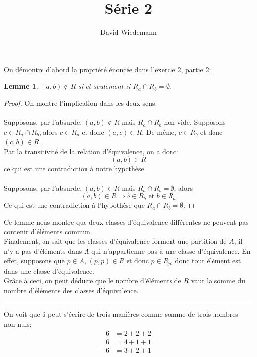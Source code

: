 \documentclass[11pt, a4paper]{article}
\newtheorem{lemma}{Lemme}
\newcommand\hr{
    \noindent\rule[0.5ex]{\linewidth}{0.5pt}\newline
}
\begin{document}
\title{Série 2}
\author{David Wiedemann}
\maketitle
On démontre d'abord la propriété énoncée dans l'exercie 2, partie 2:
\begin{lemma}
	$(a,b) \notin R$ si et seulement si $R_a \cap R_b = \emptyset$.
\end{lemma}
\begin{proof}
On montre l'implication dans les deux sens.\\
\framebox[1.1\width]{$  \Longrightarrow $}\\
Supposons, par l'absurde, $(a,b) \notin R$ mais $R_a \cap R_b$ non vide.
Supposons $ c \in R_a \cap R_b$, alors $c \in R_a$ et donc $(a,c) \in R$.
De même, $c \in R_b$ et donc $(c,b) \in R$.\\
Par la transitivité de la relation d'équivalence, on a donc:
\[ 
	(a,b) \in R
\]
ce qui est une contradiction à notre hypothèse.\\
\framebox[1.1\width]{$  \Longleftarrow $}\\
Supposons, par l'absurde, $(a,b) \in R$ mais $R_a \cap R_b = \emptyset$, alors
\[ 
	( a,b) \in R \Rightarrow b \in R_b \text{ et }  b \in R_a
\]
Ce qui est une contradiction à l'hypothèse que $R_a \cap R_b = \emptyset$.
\end{proof}

Ce lemme nous montre que deux classes d'équivalence différentes ne peuvent pas contenir d'éléments commun.\\
Finalement, on sait que les classes d'équivalence forment une partition de $A$, il n'y a pas d'éléments dans $A$ qui n'appartienne pas à une classe d'équivalence. En effet, supposons que $p \in A$, $(p,p) \in R$ et donc $p \in R_p$, donc tout élément est dans une classe d'équivalence.\\
Grâce à ceci, on peut déduire que le nombre d'éléments de $R$ vaut la somme du nombre d'éléments des classes d'équivalence.\\
\hr
On voit que 6 peut s'écrire de trois manières comme somme de trois nombres non-nuls:
\begin{align*}
	6&= 2+2+2\\
	6&= 4+1+1\\
	6&= 3+2+1
\end{align*}
\end{document}
